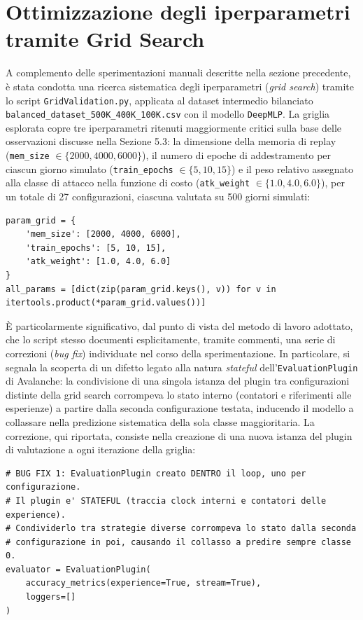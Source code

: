 \documentclass[12pt,a4paper]{report}
\begin{document}
\section{Ottimizzazione degli iperparametri tramite Grid Search}

A complemento delle sperimentazioni manuali descritte nella sezione precedente, è stata condotta una ricerca sistematica degli iperparametri (\emph{grid search}) tramite lo script \texttt{GridValidation.py}, applicata al dataset intermedio bilanciato \texttt{balanced\_dataset\_500K\_400K\_100K.csv} con il modello \texttt{DeepMLP}. La griglia esplorata copre tre iperparametri ritenuti maggiormente critici sulla base delle osservazioni discusse nella Sezione 5.3: la dimensione della memoria di replay (\texttt{mem\_size} $\in \{2000, 4000, 6000\}$), il numero di epoche di addestramento per ciascun giorno simulato (\texttt{train\_epochs} $\in \{5, 10, 15\}$) e il peso relativo assegnato alla classe di attacco nella funzione di costo (\texttt{atk\_weight} $\in \{1.0, 4.0, 6.0\}$), per un totale di 27 configurazioni, ciascuna valutata su 500 giorni simulati:

\begin{lstlisting}[caption={Griglia di iperparametri esplorata (\texttt{GridValidation.py})}]
param_grid = {
    'mem_size': [2000, 4000, 6000],
    'train_epochs': [5, 10, 15],
    'atk_weight': [1.0, 4.0, 6.0]
}
all_params = [dict(zip(param_grid.keys(), v)) for v in itertools.product(*param_grid.values())]
\end{lstlisting}

È particolarmente significativo, dal punto di vista del metodo di lavoro adottato, che lo script stesso documenti esplicitamente, tramite commenti, una serie di correzioni (\emph{bug fix}) individuate nel corso della sperimentazione. In particolare, si segnala la scoperta di un difetto legato alla natura \emph{stateful} dell'\texttt{EvaluationPlugin} di Avalanche: la condivisione di una singola istanza del plugin tra configurazioni distinte della grid search corrompeva lo stato interno (contatori e riferimenti alle esperienze) a partire dalla seconda configurazione testata, inducendo il modello a collassare nella predizione sistematica della sola classe maggioritaria. La correzione, qui riportata, consiste nella creazione di una nuova istanza del plugin di valutazione a ogni iterazione della griglia:

\begin{lstlisting}[caption={Correzione della condivisione errata dell'EvaluationPlugin tra configurazioni (\texttt{GridValidation.py})}]
# BUG FIX 1: EvaluationPlugin creato DENTRO il loop, uno per configurazione.
# Il plugin e' STATEFUL (traccia clock interni e contatori delle experience).
# Condividerlo tra strategie diverse corrompeva lo stato dalla seconda
# configurazione in poi, causando il collasso a predire sempre classe 0.
evaluator = EvaluationPlugin(
    accuracy_metrics(experience=True, stream=True),
    loggers=[]
)
\end{lstlisting}
\end{document}

